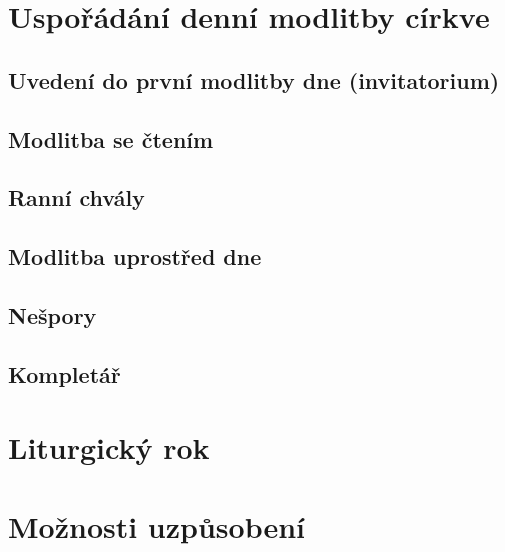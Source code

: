 \documentclass[a5paper, twoside]{article}
\begin{document}
\section{Uspořádání denní modlitby církve}
\subsection{Uvedení do první modlitby dne (invitatorium)}
\subsection{Modlitba se čtením}
\subsection{Ranní chvály}
\subsection{Modlitba uprostřed dne}
\subsection{Nešpory}
\subsection{Kompletář}

\section{Liturgický rok}

\section{Možnosti uzpůsobení}
\end{document}
